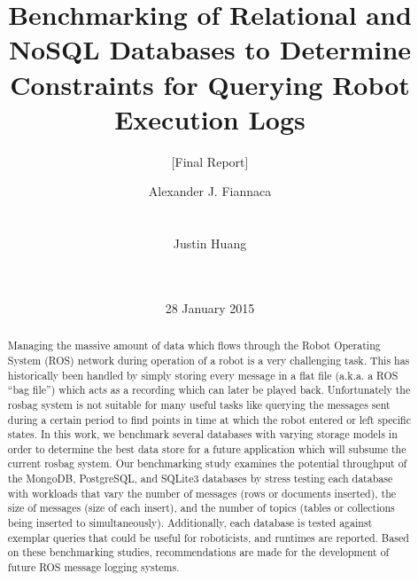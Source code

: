 \documentclass[nocopyrightspace]{acm_proc_article-sp}
\begin{document}
\title{Benchmarking of Relational and NoSQL Databases to Determine Constraints for Querying Robot Execution Logs}
\subtitle{[Final Report]}


\author{
\alignauthor
Alexander J. Fiannaca\\
       \\
       \\
\alignauthor
Justin Huang\\
       \\
       \\
}

\date{28 January 2015}

\maketitle

\begin{abstract}
Managing the massive amount of data which flows through the Robot Operating System (ROS) network during operation of a robot is a very challenging task. This has historically been handled by simply storing every message in a flat file (a.k.a. a ROS ``bag file'') which acts as a recording which can later be played back. Unfortunately the rosbag system is not suitable for many useful tasks like querying the messages sent during a certain period to find points in time at which the robot entered or left specific states. In this work, we benchmark several databases with varying storage models in order to determine the best data store for a future application which will subsume the current rosbag system. Our benchmarking study examines the potential throughput of the MongoDB, PostgreSQL, and SQLite3 databases by stress testing each database with workloads that vary the number of messages (rows or documents inserted), the size of messages (size of each insert), and the number of topics (tables or collections being inserted to simultaneously). Additionally, each database is tested against exemplar queries that could be useful for roboticists, and runtimes are reported. Based on these benchmarking studies, recommendations are made for the development of future ROS message logging systems.
\end{abstract}

\end{document}
